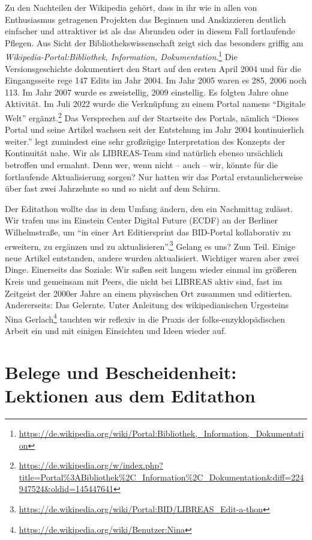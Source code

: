 \documentclass[a4paper,
fontsize=11pt,
oneside,
numbers=noperiodatend,
parskip=half-,
bibliography=totoc,
final
]{scrartcl}
\begin{document}
Zu den Nachteilen der Wikipedia gehört, dass in ihr wie in allen von
Enthusiasmus getragenen Projekten das Beginnen und Anskizzieren deutlich
einfacher und attraktiver ist als das Abrunden oder in diesem Fall
fortlaufende Pflegen. Aus Sicht der Bibliothekswissenschaft zeigt sich
das besonders griffig am \emph{Wikipedia-Portal:Bibliothek, Information,
Dokumentation}.\footnote{\url{https://de.wikipedia.org/wiki/Portal:Bibliothek,_Information,_Dokumentation}}
Die Versionsgeschichte dokumentiert den Start auf den ersten April 2004
und für die Eingangsseite rege 147 Edits im Jahr 2004. Im Jahr 2005
waren es 285, 2006 noch 113. Im Jahr 2007 wurde es zweistellig, 2009
einstellig. Es folgten Jahre ohne Aktivität. Im Juli 2022 wurde die
Verknüpfung zu einem Portal namens \enquote{Digitale Welt}
ergänzt.\footnote{\url{https://de.wikipedia.org/w/index.php?title=Portal\%3ABibliothek\%2C_Information\%2C_Dokumentation&diff=224947524&oldid=145447641}}
Das Versprechen auf der Startseite des Portals, nämlich \enquote{Dieses
Portal und seine Artikel wachsen seit der Entstehung im Jahr 2004
kontinuierlich weiter.} legt zumindest eine sehr großzügige
Interpretation des Konzepts der Kontinuität nahe. Wir als LIBREAS-Team
sind natürlich ebenso ursächlich betroffen und ermahnt. Denn wer, wenn
nicht -- auch -- wir, könnte für die fortlaufende Aktualisierung sorgen?
Nur hatten wir das Portal erstaunlicherweise über fast zwei Jahrzehnte
so und so nicht auf dem Schirm.

Der Editathon wollte das in dem Umfang ändern, den ein Nachmittag
zulässt. Wir trafen uns im Einstein Center Digital Future (ECDF) an der
Berliner Wilhelmstraße, um \enquote{in einer Art Editiersprint das
BID-Portal kollaborativ zu erweitern, zu ergänzen und zu
aktualisieren}.\footnote{\url{https://de.wikipedia.org/wiki/Portal:BID/LIBREAS_Edit-a-thon}}
Gelang es uns? Zum Teil. Einige neue Artikel entstanden, andere wurden
aktualisiert. Wichtiger waren aber zwei Dinge. Einerseits das Soziale:
Wir saßen seit langem wieder einmal im größeren Kreis und gemeinsam mit
Peers, die nicht bei LIBREAS aktiv sind, fast im Zeitgeist der 2000er
Jahre an einem physischen Ort zusammen und editierten. Andererseits: Das
Gelernte. Unter Anleitung des wikipedianischen Urgesteins Nina
Gerlach\footnote{\url{https://de.wikipedia.org/wiki/Benutzer:Nina}}
tauchten wir reflexiv in die Praxis der folks-enzyklopädischen Arbeit
ein und mit einigen Einsichten und Ideen wieder auf.

\section{Belege und Bescheidenheit: Lektionen aus dem
Editathon}\label{belege-und-bescheidenheit-lektionen-aus-dem-editathon}
\end{document}
